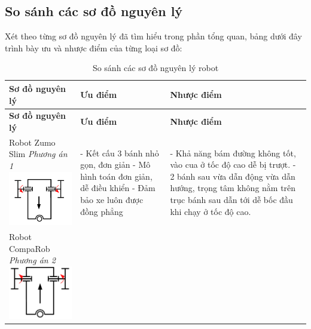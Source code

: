         \subsection{So sánh các sơ đồ nguyên lý}
            \hspace*{0.6cm}Xét theo từng sơ đồ nguyên lý đã tìm hiểu trong phần tổng quan, bảng dưới đây 
                            trình bày ưu và nhược điểm của từng loại sơ đồ:
            \begin{longtable}{|p{4cm}|p{5cm}|p{5cm}|}
                \caption{So sánh các sơ đồ nguyên lý robot} 
                \label{tab:compare_robot_schemes} \\ 
                \hline
                \textbf{Sơ đồ nguyên lý} & \textbf{Ưu điểm} & \textbf{Nhược điểm} \\
                \hline
                \endfirsthead
                \hline
                \textbf{Sơ đồ nguyên lý} & \textbf{Ưu điểm} & \textbf{Nhược điểm} \\
                \hline
                \endhead
                \hline
                \endfoot
                \hline
                \endlastfoot
                Robot Zumo Slim \newline
                \textit{Phương án 1} \newline
                \includegraphics[width=3cm]{pictures/chapter2/chapter2_pic_1.png} & 
                - Kết cấu 3 bánh nhỏ gọn, đơn giản \newline
                - Mô hình toán đơn giản, dễ điều khiển \newline
                - Đảm bảo xe luôn được đồng phẳng & 
                - Khả năng bám đường không tốt, vào cua ở tốc độ cao dễ bị trượt. \newline
                - 2 bánh sau vừa dẫn động vừa dẫn hướng, trọng tâm không nằm trên trục bánh sau dẫn tới dễ bốc đầu khi chạy ở tốc độ cao. \\
                \hline
                Robot CompaRob \newline
                \textit{Phương án 2} \newline
                \includegraphics[width=3cm]{pictures/chapter2/chapter2_pic_2.png} & 

\end{longtable}
